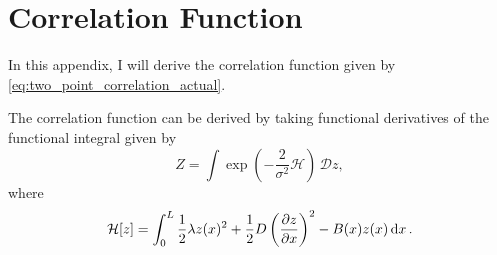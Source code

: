\chapter{Correlation Function}
\label{appendix:correlation_function}

In this appendix, I will derive the correlation function given by \cref{eq:two_point_correlation_actual}.

The correlation function can be derived by taking functional derivatives of the functional integral given by
 \begin{equation}
   \label{eq:path_integral}
   Z = \int \exp\left( -\frac{2}{\sigma^2} \mathcal{H} \right) \, \mathcal{D}z,
 \end{equation}
 where
 \begin{equation}
   \label{eq:hamiltonian}
   \mathcal{H}[z] = \int_0^L \frac{1}{2}\lambda z(x)^2 + \frac{1}{2}D\left(\pdv{z}{x}\right)^2 - B(x)z(x)\dd{x}.
 \end{equation}


